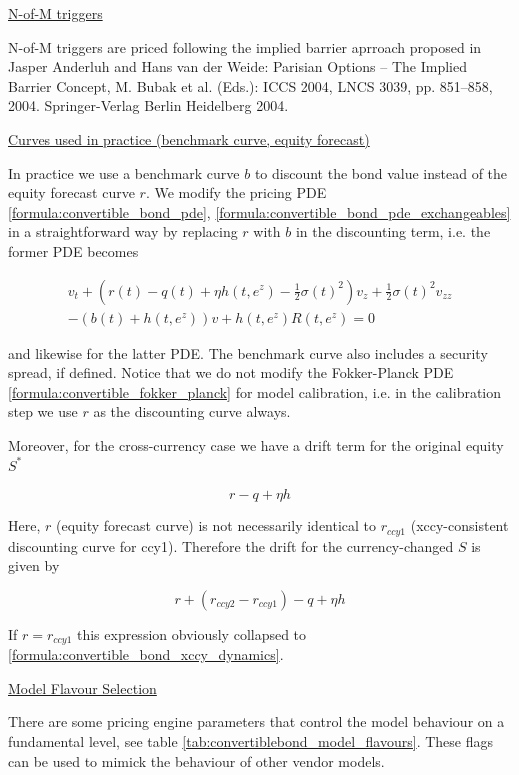 \underline{N-of-M triggers}

N-of-M triggers are priced following the implied barrier aprroach proposed in Jasper Anderluh and Hans van der Weide:
Parisian Options – The Implied Barrier Concept, M. Bubak et al. (Eds.): ICCS 2004, LNCS 3039, pp. 851–858,
2004. Springer-Verlag Berlin Heidelberg 2004.

\underline{Curves used in practice (benchmark curve, equity forecast)}

In practice we use a benchmark curve $b$ to discount the bond value instead of the equity forecast curve $r$. We modify
the pricing PDE \ref{formula:convertible_bond_pde}, \ref{formula:convertible_bond_pde_exchangeables} in a
straightforward way by replacing $r$ with $b$ in the discounting term, i.e. the former PDE becomes

\begin{eqnarray}\label{formula:convertible_bond_pde_with_benchmark_curve}
v_t + \left( r(t)-q(t)+\eta h(t,e^z)-\frac{1}{2}\sigma(t)^2 \right) v_z + \frac{1}{2}\sigma(t)^2 v_{zz}  \\
- (b(t)+h(t,e^z)) v + h(t,e^z) R(t,e^z) = 0
\end{eqnarray}

and likewise for the latter PDE. The benchmark curve also includes a security spread, if defined. Notice that we do not
modify the Fokker-Planck PDE \ref{formula:convertible_fokker_planck} for model calibration, i.e. in the calibration step
we use $r$ as the discounting curve always.

Moreover, for the cross-currency case we have a drift term for the original equity $S^*$

\begin{equation}
  r - q + \eta h
\end{equation}

Here, $r$ (equity forecast curve) is not necessarily identical to $r_{ccy1}$ (xccy-consistent discounting curve for
ccy1). Therefore the drift for the currency-changed $S$ is given by

\begin{equation}
  r + ( r_{ccy2} - r_{ccy1}) - q + \eta h
\end{equation}

If $r=r_{ccy1}$ this expression obviously collapsed to \ref{formula:convertible_bond_xccy_dynamics}.

\underline{Model Flavour Selection}

There are some pricing engine parameters that control the model behaviour on a fundamental level, see table
\ref{tab:convertiblebond_model_flavours}. These flags can be used to mimick the behaviour of other vendor models.

